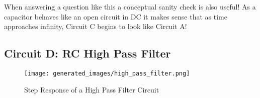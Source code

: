 \documentclass[main.tex]{subfiles}
\begin{document}


When answering a question like this a conceptual sanity check is also useful! As a capacitor behaves like an open circuit in DC it makes sense that as time approaches infinity, Circuit C begins to look like Circuit A! 

\subsection{Circuit D: RC High Pass Filter}

\begin{figure}[H]
    \centering
    \texttt{[image: generated\_images/high\_pass\_filter.png]}
    \caption{Step Response of a High Pass Filter Circuit}
    \label{fig:step-response-high-pass-filter}
\end{figure}





\end{document}
